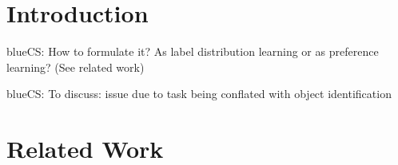 \documentclass[11pt,a4paper]{article}
\title{}
\author{
 Template Affiliation/Address Line 1 \\
 Template Affiliation/Address Line 2 \\
 Template Affiliation/Address Line 2 \\
  {\sf template.email@sampledomain.com} \\
}
\date{}
\newcommand{\cs}[1]{\begin{color}{blue}CS: #1\end{color}\xspace}
\begin{document}
\maketitle
\begin{abstract}

\begin{itemize}
	\item We address the task of human object naming: given an object that is depicted in an image, produce the name for it. 
	\item While people, when being asked to name an object, tend to agree on a specific name in many cases, there is also variation (REF). The choice of a name for an individual object can thus be considered to underlie some probability distribution over possible names, representing naming preferences. 
	\cs{How could we examine in how far/under which conditions the difference in rankings between two objects is not by chance? randomised test?}
	\item Variation can be effected by several factors, such as the appearance of the object itself, or its situated context (both have been studied in psychological research, REF). 
	\item Our goal is to understand the factors which play a role in preferring one name over valid name alternatives for individual objects. 
	\item We formulate the task of object naming as the prediction of  object name preferences, and present XXX model. 
	\item We examine the factors: 
	\item Our results show that XXX.
	
\end{itemize}
 
\end{abstract}

\section{Introduction}
\label{sec:introduction}

\cs{How to formulate it? As label distribution learning or as preference learning? (See related work)}
\cs{To discuss: issue due to task being conflated with object identification}
\section{Related Work}
\label{sec:related}
\end{document}
